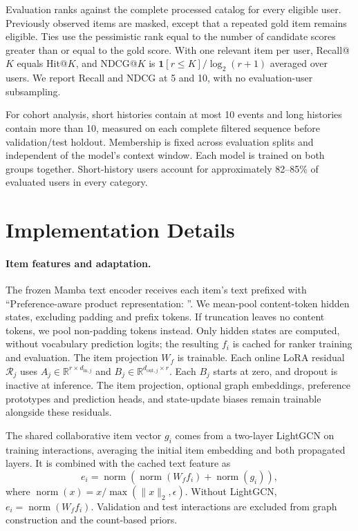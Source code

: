 \documentclass[11pt]{article}
\newcommand{\norm}[1]{\operatorname{norm}(#1)}
\begin{document}
Evaluation ranks against the complete processed catalog for every eligible user. Previously observed items are masked, except that a repeated gold item remains eligible. Ties use the pessimistic rank equal to the number of candidate scores greater than or equal to the gold score. With one relevant item per user, Recall@$K$ equals Hit@$K$, and NDCG@$K$ is $\mathbf 1[r\leq K]/\log_2(r+1)$ averaged over users. We report Recall and NDCG at 5 and 10, with no evaluation-user subsampling.

For cohort analysis, short histories contain at most 10 events and long histories contain more than 10, measured on each complete filtered sequence before validation/test holdout. Membership is fixed across evaluation splits and independent of the model's context window. Each model is trained on both groups together. Short-history users account for approximately 82--85\% of evaluated users in every category.

\section{Implementation Details}
\label{app:implementation}
\paragraph{Item features and adaptation.}
The frozen Mamba text encoder receives each item's text prefixed with ``Preference-aware product representation: ''. We mean-pool content-token hidden states, excluding padding and prefix tokens. If truncation leaves no content tokens, we pool non-padding tokens instead. Only hidden states are computed, without vocabulary prediction logits; the resulting $f_i$ is cached for ranker training and evaluation. The item projection $W_f$ is trainable. Each online LoRA residual $\mathcal R_j$ uses $A_j\in\mathbb R^{r\times d_{\mathrm{in},j}}$ and $B_j\in\mathbb R^{d_{\mathrm{out},j}\times r}$. Each $B_j$ starts at zero, and dropout is inactive at inference. The item projection, optional graph embeddings, preference prototypes and prediction heads, and state-update biases remain trainable alongside these residuals.

The shared collaborative item vector $g_i$ comes from a two-layer LightGCN on training interactions, averaging the initial item embedding and both propagated layers. It is combined with the cached text feature as
\begin{equation}
 e_i=\norm{\norm{W_f f_i}+\norm{g_i}},
\end{equation}
where $\norm{x}=x/\max(\lVert x\rVert_2,\epsilon)$. Without LightGCN, $e_i=\norm{W_f f_i}$. Validation and test interactions are excluded from graph construction and the count-based priors.
\end{document}
